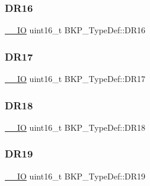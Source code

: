 \mbox{\label{struct_b_k_p___type_def_a2824f0970d27bb9edf16075ac54fae23}} 
\subsubsection{\texorpdfstring{DR16}{DR16}}
{\footnotesize\ttfamily \mbox{\hyperlink{group___c_m_s_i_s___c_m3__core__definitions_gaec43007d9998a0a0e01faede4133d6be}{\+\_\+\+\_\+\+IO}} uint16\+\_\+t B\+K\+P\+\_\+\+Type\+Def\+::\+D\+R16}

\mbox{\label{struct_b_k_p___type_def_a78b37ff2fb91c016b8436f1218b10a4f}} 
\subsubsection{\texorpdfstring{DR17}{DR17}}
{\footnotesize\ttfamily \mbox{\hyperlink{group___c_m_s_i_s___c_m3__core__definitions_gaec43007d9998a0a0e01faede4133d6be}{\+\_\+\+\_\+\+IO}} uint16\+\_\+t B\+K\+P\+\_\+\+Type\+Def\+::\+D\+R17}

\mbox{\label{struct_b_k_p___type_def_a9a1b09d229ccb45e67108fdfee779d1d}} 
\subsubsection{\texorpdfstring{DR18}{DR18}}
{\footnotesize\ttfamily \mbox{\hyperlink{group___c_m_s_i_s___c_m3__core__definitions_gaec43007d9998a0a0e01faede4133d6be}{\+\_\+\+\_\+\+IO}} uint16\+\_\+t B\+K\+P\+\_\+\+Type\+Def\+::\+D\+R18}

\mbox{\label{struct_b_k_p___type_def_a7bddb28e7571f4c91ad1990123a61d7e}} 
\subsubsection{\texorpdfstring{DR19}{DR19}}
{\footnotesize\ttfamily \mbox{\hyperlink{group___c_m_s_i_s___c_m3__core__definitions_gaec43007d9998a0a0e01faede4133d6be}{\+\_\+\+\_\+\+IO}} uint16\+\_\+t B\+K\+P\+\_\+\+Type\+Def\+::\+D\+R19}

